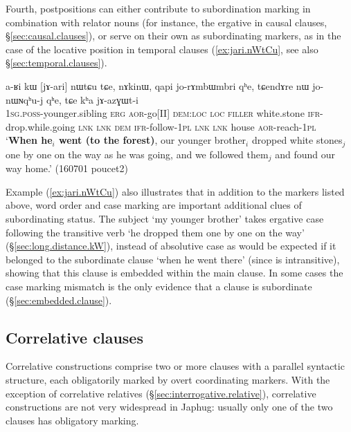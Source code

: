 Fourth, postpositions can either contribute to subordination marking in combination with relator nouns (for instance, the ergative in causal clauses, §\ref{sec:causal.clauses}), or serve on their own as subordinating markers, as in the case of the locative position in temporal clauses (\ref{ex:jari.nWtCu}, see also §\ref{sec:temporal.clauses}).

 \begin{exe}
\ex \label{ex:jari.nWtCu}
\gll a-ʁi kɯ [jɤ-ari] nɯtɕu tɕe, nɤkinɯ, qapi jo-rɤmbɯmbri qʰe, tɕendɤre nɯ jo-nɯɴqʰu-j qʰe, tɕe kʰa jɤ-azɣɯt-i \\
\textsc{1sg}.\textsc{poss}-younger.sibling \textsc{erg} \textsc{aor}-go[II] \textsc{dem}:\textsc{loc} \textsc{loc} \textsc{filler} white.stone \textsc{ifr}-drop.while.going \textsc{lnk} \textsc{lnk} \textsc{dem} \textsc{ifr}-follow-\textsc{1pl} \textsc{lnk} \textsc{lnk} house \textsc{aor}-reach-\textsc{1pl} \\
\glt `\textbf{When he$_i$ went (to the forest)}, our younger brother$_i$ dropped white stones$_j$ one by one on the way as he was going, and we followed them$_j$ and found our way home.' (160701 poucet2)
\end{exe}

Example (\ref{ex:jari.nWtCu}) also illustrates that in addition to the markers listed above, word order and case marking are important additional clues of subordinating status. The subject  `my younger brother' takes ergative case following the transitive verb  `he dropped them one by one on the way' (§\ref{sec:long.distance.kW}), instead of absolutive case as would be expected if it belonged to the subordinate clause  `when he went there' (since  is intransitive), showing that this clause is embedded within the main clause. In some cases the case marking mismatch is the only evidence that a clause is subordinate (§\ref{sec:embedded.clause}).

\subsection{Correlative clauses}  \label{sec:correlative.clauses}
Correlative constructions comprise two or more clauses with a parallel syntactic structure, each obligatorily marked by overt coordinating markers. With the exception of correlative relatives (§\ref{sec:interrogative.relative}), correlative constructions are not very widespread in Japhug: usually only one of the two clauses has obligatory marking.

